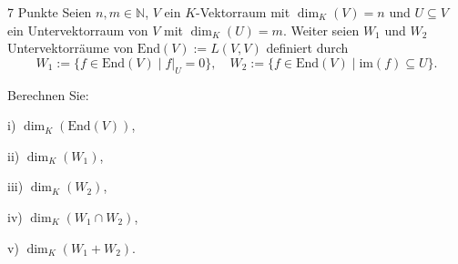 \documentclass{../problemset}
\begin{document}
\begin{problem}{7 Punkte}
Seien $n, m \in \mathbb{N}$, $V$ ein $K$-Vektorraum mit $\dim_K(V) = n$ und $U \subseteq V$ ein Untervektorraum von $V$ mit $\dim_K(U) = m$. Weiter seien $W_1$ und $W_2$ Untervektorräume von $\text{End}(V) := L(V, V)$ definiert durch
\[ W_1 := \{f \in \text{End}(V) \mid f|_U = 0\}, \quad W_2 := \{f \in \text{End}(V) \mid \text{im}(f) \subseteq U\}. \]

Berechnen Sie:

i) $\dim_K(\text{End}(V))$,

ii) $\dim_K(W_1)$,

iii) $\dim_K(W_2)$,

iv) $\dim_K(W_1 \cap W_2)$,

v) $\dim_K(W_1 + W_2)$.
\end{problem}
\end{document}
